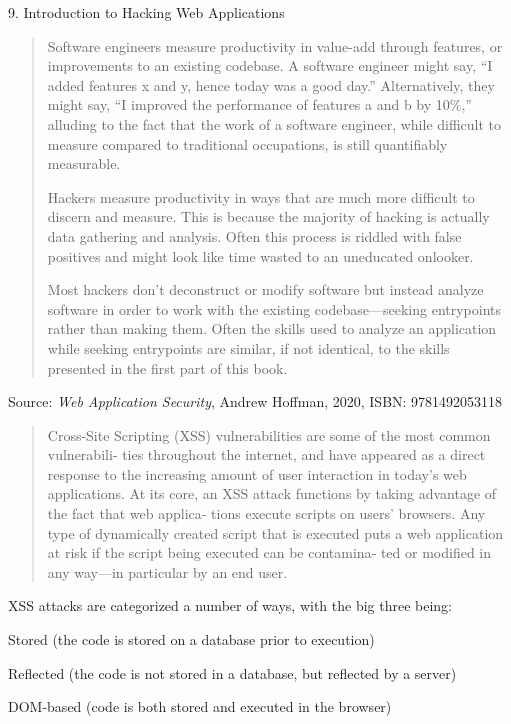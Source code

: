 \documentclass[Screen16to9,17pt]{foils}
\begin{document}

{\large 9. Introduction to Hacking Web Applications}

\begin{quote}
Software engineers measure productivity in value-add through features, or improvements to an existing codebase. A software engineer might say, “I added features x and y, hence today was a good day.” Alternatively, they might say, “I improved the performance of features a and b by 10\%,” alluding to the fact that the work of a software engineer, while difficult to measure compared to traditional occupations, is still quantifiably measurable.

Hackers measure productivity in ways that are much more difficult to discern and measure. This is because the majority of hacking is actually data gathering and analysis. Often this process is riddled with false positives and might look like time wasted to an uneducated onlooker.

Most hackers don’t deconstruct or modify software but instead analyze software in order to work with the existing codebase—seeking entrypoints rather than making them. Often the skills used to analyze an application while seeking entrypoints are similar, if not identical, to the skills presented in the first part of this book.
\end{quote}
Source: \emph{Web Application Security}, Andrew Hoffman, 2020, ISBN: 9781492053118




\begin{quote}
  Cross-Site Scripting (XSS) vulnerabilities are some of the most common vulnerabili‐
  ties throughout the internet, and have appeared as a direct response to the increasing
  amount of user interaction in today’s web applications.
  At its core, an XSS attack functions by taking advantage of the fact that web applica‐
  tions execute scripts on users’ browsers. Any type of dynamically created script that is
  executed puts a web application at risk if the script being executed can be contamina‐
  ted or modified in any way—in particular by an end user.
\end{quote}

XSS attacks are categorized a number of ways, with the big three being:
\begin{list2}
  \item Stored (the code is stored on a database prior to execution)
\item Reflected (the code is not stored in a database, but reflected by a server)
\item DOM-based (code is both stored and executed in the browser)
\end{list2}
\end{document}
